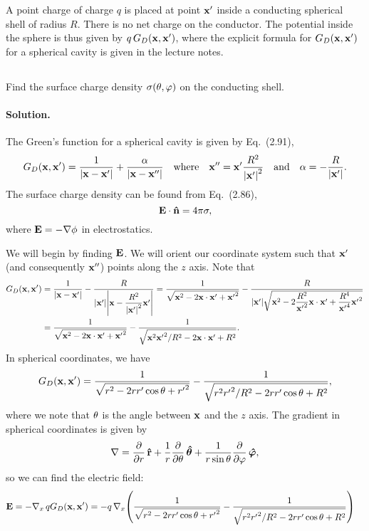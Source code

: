 \documentclass[11pt]{article}
\newcommand{\beq}{\begin{equation*}}
\newcommand{\eeq}{\end{equation*}}
\newenvironment{statement}[1]
{
	\section{#1}
	\color{darkgray}
	\ignorespaces
}
{
}
\newenvironment{problem}
{
	\subsection{}
	\color{darkgray}
    \ignorespaces
}
{

}
\newenvironment{solution}
{
    \paragraph{Solution.}
    \ignorespaces
}
{
    \bigskip
}
\begin{document}
\begin{statement}{}
	A point charge of charge $q$ is placed at point $\mathbf{x}'$ inside a conducting spherical shell of radius $R$.  There is no net charge on the conductor.  The potential inside the sphere is thus given by $q \, G_D(\mathbf{x}, \mathbf{x}')$, where the explicit formula for $G_D(\mathbf{x}, \mathbf{x}')$ for a spherical cavity is given in the lecture notes.
\end{statement}

\begin{problem}
	Find the surface charge density $\sigma(\theta, \varphi)$ on the conducting shell.
\end{problem}

\begin{solution}
	The Green's function for a spherical cavity is given by Eq.~(2.91),
	\beq
		\Gdxxp = \frac{1}{\abs{\vx - \vx'}} + \frac{\alp}{\abs{\vx - \vx''}} \qq{where} \vx'' = \vx' \frac{R^2}{\absxp^2} \qand \alp = - \frac{R}{\absxp}.
	\eeq
	The surface charge density can be found from Eq.~(2.86),
	\beq
		\vE \cdot \nh = 4\pi \sig,
	\eeq
	where $\mathbf{E} = -\nabla \phi$ in electrostatics.
	
	We will begin by finding $\mathbf{E}$.  We will orient our coordinate system such that $\mathbf{x}'$ (and consequently $\mathbf{x}''$) points along the $z$ axis.  Note that
	\begin{align*}
		G_D(\mathbf{x}, \mathbf{x}') &= \frac{1}{\abs{\mathbf{x} - \mathbf{x}'}} - \frac{R}{\abs{\mathbf{x}'} \abs{\mathbf{x} - \dfrac{R^2}{\abs{\mathbf{x}'}^2} \mathbf{x}'}}
		= \frac{1}{\sqrt{\mathbf{x}^2 - 2 \mathbf{x} \cdot \mathbf{x}' + {\mathbf{x}'}^2}} - \frac{R}{\abs{\mathbf{x}'} \sqrt{\mathbf{x}^2 - 2 \dfrac{R^2}{{\mathbf{x}'}^2} \mathbf{x} \cdot \mathbf{x}' + \dfrac{R^4}{{\mathbf{x}'}^4} {\mathbf{x}'}^2}} \\
		&= \frac{1}{\sqrt{\mathbf{x}^2 - 2 \mathbf{x} \cdot \mathbf{x}' + {\mathbf{x}'}^2}} - \frac{1}{\sqrt{\mathbf{x}^2 {\mathbf{x}'}^2 / R^2 - 2 \mathbf{x} \cdot \mathbf{x}' + R^2}}.
	\end{align*}
	In spherical coordinates, we have
	\beq
		\Gdxxp = \frac{1}{\sqrt{r^2 - 2 r r' \cost + {r'}^2}} - \frac{1}{\sqrt{r^2 {r'}^2 / R^2 - 2 r r' \cost + R^2}},
	\eeq
	where we note that $\theta$ is the angle between $\mathbf{x}$ and the $z$ axis.  The gradient in spherical coordinates is given by
	\beq
		\nabla = \pdv{}{r} \,\rh + \frac{1}{r} \pdv{}{\tht} \,\thh + \frac{1}{r \sint} \pdv{}{\vph} \, \phh,
	\eeq
	so we can find the electric field:
	\begin{align*}
		\mathbf{E} &= -\nabla_x \, q G_D(\mathbf{x}, \mathbf{x}')
		= -q \, \nabla_x \! \left( \frac{1}{\sqrt{r^2 - 2 r r' \cos\theta + {r'}^2}} - \frac{1}{\sqrt{r^2 {r'}^2 / R^2 - 2 r r' \cos\theta + R^2}} \right)
	\end{align*}
	
\end{solution}
\end{document}
